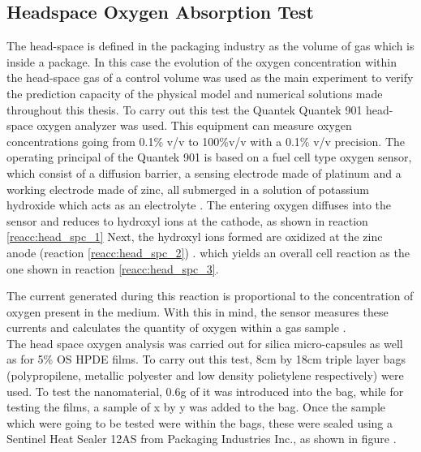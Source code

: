 \begin{refsection}
\subsection{Headspace Oxygen Absorption Test}\label{sec:headspace}
The head-space is defined in the packaging industry as the volume of gas which is inside a package. In this case the evolution of the oxygen concentration within the head-space gas of a control volume was used as the main experiment to verify the prediction capacity of the physical model and numerical solutions made throughout this thesis. To carry out this test the Quantek Quantek 901 head-space oxygen analyzer was used. This equipment can measure oxygen concentrations going from 0.1\% v/v to 100\%v/v with a 0.1\% v/v precision. The operating principal of the Quantek 901 is based on a fuel cell type oxygen sensor, which consist of a diffusion barrier, a sensing electrode made of platinum and a working electrode made of zinc, all submerged in a solution of potassium hydroxide which acts as an electrolyte \cite{Boissevain1996CorporateGuide}. The entering oxygen diffuses into the sensor and reduces to hydroxyl ions at the cathode, as shown in reaction \ref{reacc:head_spc_1}  Next, the hydroxyl ions formed are oxidized at the zinc anode (reaction \ref{reacc:head_spc_2}) .
 which yields an overall cell reaction as the one shown in reaction \ref{reacc:head_spc_3}.

 
 The current generated during this reaction is proportional to the concentration of oxygen present in the medium. With this in mind,  the sensor measures these currents and calculates the quantity of oxygen within a gas sample \cite{GarciaMora2015KineticScavengers, Boissevain1996CorporateGuide}.\\
 
 The head space oxygen analysis was carried out for silica micro-capsules as well as for 5\% OS HPDE films. To carry out this test, 8cm by 18cm triple layer bags (polypropilene, metallic polyester and low density polietylene respectively) were used. To test the nanomaterial, 0.6g of it was introduced into the bag, while for testing the films, a sample of x by y was added to the bag.  Once the sample which were going to be tested were within the bags, these were sealed using a Sentinel Heat Sealer 12AS from Packaging Industries Inc., as shown in figure .
 

\end{refsection}
